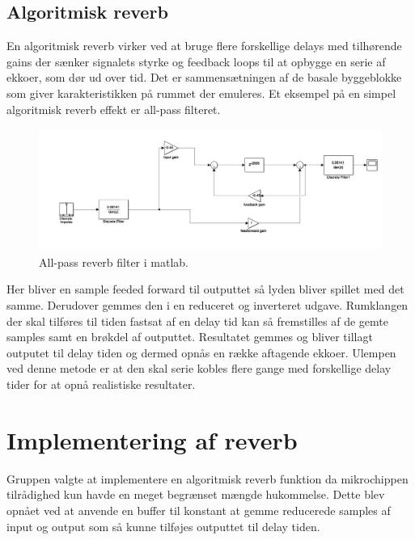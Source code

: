 \subsection{Algoritmisk reverb}
En algoritmisk reverb virker ved at bruge flere forskellige delays med tilhørende gains der sænker signalets styrke og feedback loops til at opbygge en serie af ekkoer, som dør ud over tid.
Det er sammensætningen af de basale byggeblokke som giver karakteristikken på rummet der emuleres.\newline
Et eksempel på en simpel algoritmisk reverb effekt er all-pass filteret.
\begin{figure}[h]
\includegraphics[width=0.8\linewidth]{./billeder/reverb-testopsaetning.png}
\caption{All-pass reverb filter i matlab.}
\label{fig:allPassMatLab}
\end{figure}
Her bliver en sample feeded forward til outputtet så lyden bliver spillet med det samme.
Derudover gemmes den i en reduceret og inverteret udgave. %
Rumklangen der skal tilføres til tiden fastsat af en delay tid kan så fremstilles af de gemte samples samt en brøkdel af outputtet.
Resultatet gemmes og bliver tillagt outputet til delay tiden og dermed opnås en række aftagende ekkoer.
Ulempen ved denne metode er at den skal serie kobles flere gange med forskellige delay tider for at opnå realistiske resultater.




\section{Implementering af reverb}
Gruppen valgte at implementere en algoritmisk reverb funktion da mikrochippen tilrådighed kun havde en meget begrænset mængde hukommelse.
Dette blev opnået ved at anvende en buffer til konstant at gemme reducerede samples af input og output som så kunne tilføjes outputtet til delay tiden.

